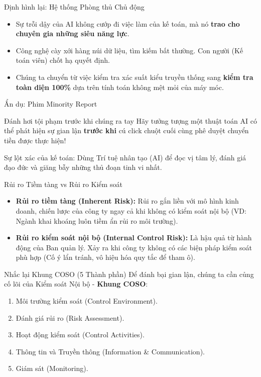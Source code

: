 \documentclass[aspectratio=169]{beamer}
\begin{document}
\begin{frame}{Định hình lại: Hệ thống Phòng thủ Chủ động}
    \begin{itemize}
        \item Sự trỗi dậy của AI không cướp đi việc làm của kế toán, mà nó \textbf{trao cho chuyên gia những siêu năng lực}.
        \item Công nghệ cày xới hàng núi dữ liệu, tìm kiếm bất thường. Con người (Kế toán viên) chốt hạ quyết định.
        \item Chúng ta chuyển từ việc kiểm tra xác suất kiểu truyền thống sang \textbf{kiểm tra toàn diện 100\%} dựa trên tính toán không mệt mỏi của máy móc.
    \end{itemize}
\end{frame}

\begin{frame}{Ẩn dụ: Phim Minority Report}
    \begin{exampleblock}{Đánh hơi tội phạm trước khi chúng ra tay}
        Hãy tưởng tượng một thuật toán AI có thể phát hiện sự gian lận \textbf{trước khi} cú click chuột cuối cùng phê duyệt chuyển tiền được thực hiện!
    \end{exampleblock}
    \vspace{0.3cm}
    Sự lột xác của kế toán: Dùng Trí tuệ nhân tạo (AI) để đọc vị tâm lý, đánh giá đạo đức và giăng bẫy những thủ đoạn tinh vi nhất.
\end{frame}

\begin{frame}{Rủi ro Tiềm tàng vs Rủi ro Kiểm soát}
    \begin{itemize}
        \item \textbf{Rủi ro tiềm tàng (Inherent Risk):} Rủi ro gắn liền với mô hình kinh doanh, chiến lược của công ty ngay cả khi không có kiểm soát nội bộ (VD: Ngành khai khoáng luôn tiềm ẩn rủi ro môi trường).
        \item \textbf{Rủi ro kiểm soát nội bộ (Internal Control Risk):} Là hậu quả từ hành động của Ban quản lý. Xảy ra khi công ty không có các biện pháp kiểm soát phù hợp (Cố ý lẩn tránh, vô hiệu hóa quy tắc để tham ô).
    \end{itemize}
\end{frame}

\begin{frame}{Nhắc lại Khung COSO (5 Thành phần)}
    Để đánh bại gian lận, chúng ta cần củng cố lõi của Kiểm soát Nội bộ - \textbf{Khung COSO}:
    \begin{enumerate}
        \item Môi trường kiểm soát (Control Environment).
        \item Đánh giá rủi ro (Risk Assessment).
        \item Hoạt động kiểm soát (Control Activities).
        \item Thông tin và Truyền thông (Information \& Communication).
        \item Giám sát (Monitoring).
    \end{enumerate}
\end{frame}
\end{document}

